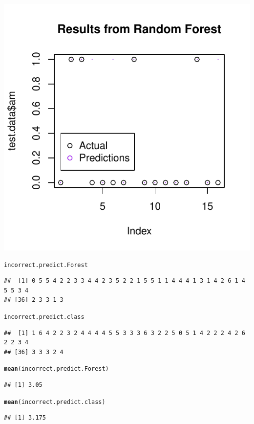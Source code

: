\documentclass{article}\usepackage[]{graphicx}\usepackage[]{color}
\makeatletter
\def\maxwidth{ %
  \ifdim\Gin@nat@width>\linewidth
    \linewidth
  \else
    \Gin@nat@width
  \fi
}
\newcommand{\hlstd}[1]{\textcolor[rgb]{0.345,0.345,0.345}{#1}}%
\newcommand{\hlkwd}[1]{\textcolor[rgb]{0.737,0.353,0.396}{\textbf{#1}}}%
\newenvironment{kframe}{%
 \def\at@end@of@kframe{}%
 \ifinner\ifhmode%
  \def\at@end@of@kframe{\end{minipage}}%
  \begin{minipage}{\columnwidth}%
 \fi\fi%
 \def\FrameCommand##1{\hskip\@totalleftmargin \hskip-\fboxsep
 \colorbox{shadecolor}{##1}\hskip-\fboxsep
     \hskip-\linewidth \hskip-\@totalleftmargin \hskip\columnwidth}%
 \MakeFramed {\advance\hsize-\width
   \@totalleftmargin\z@ \linewidth\hsize
   \@setminipage}}%
 {\par\unskip\endMakeFramed%
 \at@end@of@kframe}
\newenvironment{knitrout}{}{} %
\makeatother
\begin{document}
\begin{knitrout}
\includegraphics[width=\maxwidth]{figure/unnamed-chunk-3-3} 
\begin{kframe}\begin{alltt}
\hlstd{incorrect.predict.Forest}
\end{alltt}
\begin{verbatim}
##  [1] 0 5 5 4 2 2 3 3 4 4 2 3 5 2 2 1 5 5 1 1 4 4 4 1 3 1 4 2 6 1 4 5 5 3 4
## [36] 2 3 3 1 3
\end{verbatim}
\begin{alltt}
\hlstd{incorrect.predict.class}
\end{alltt}
\begin{verbatim}
##  [1] 1 6 4 2 2 3 2 4 4 4 4 5 5 3 3 3 6 3 2 2 5 0 5 1 4 2 2 2 4 2 6 2 2 3 4
## [36] 3 3 3 2 4
\end{verbatim}
\begin{alltt}
\hlkwd{mean}\hlstd{(incorrect.predict.Forest)}
\end{alltt}
\begin{verbatim}
## [1] 3.05
\end{verbatim}
\begin{alltt}
\hlkwd{mean}\hlstd{(incorrect.predict.class)}
\end{alltt}
\begin{verbatim}
## [1] 3.175
\end{verbatim}
\end{kframe}
\end{knitrout}
\end{document}
